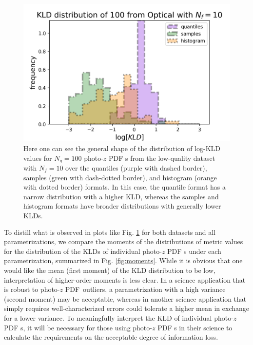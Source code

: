 \documentclass[\docopts]{\docclass}
\newcommand{\pz}{photo-$z$ PDF\xspace}
\begin{document}
\begin{figure}
  \includegraphics[width=0.9\columnwidth]{figures/lsst_individual.png}
  \caption{Here one can see the general shape of the distribution of log-KLD 
values for $N_{g}=100$ \pz s from the low-quality dataset with $N_{f}=10$ over 
the quantiles (purple with dashed border), samples (green with dash-dotted 
border), and histogram (orange with dotted border) formats.  In this case, the 
quantile format has a narrow distribution with a higher KLD, whereas the 
samples and histogram formats have broader distributions with generally lower 
KLDs.
  \label{fig:individual}}
\end{figure}

To distill what is observed in plots like Fig. \ref{fig:individual} for both 
datasets and all parametrizations, we compare the moments of the distributions 
of metric values for the distribution of the KLDs of individual \pz s under 
each parametrization, summarized in Fig. \ref{fig:moments}.  While it is 
obvious that one would like the mean (first moment) of the KLD distribution to 
be low, interpretation of higher-order moments is less clear.  In a science 
application that is robust to \pz\ outliers, a parametrization with a high 
variance (second moment) may be acceptable, whereas in another science 
application that simply requires well-characterized errors could tolerate a 
higher mean in exchange for a lower variance.  To meaningfully interpret the 
KLD of individual \pz s, it will be necessary for those using \pz s in their 
science to calculate the requirements on the acceptable degree of information 
loss.
\end{document}
